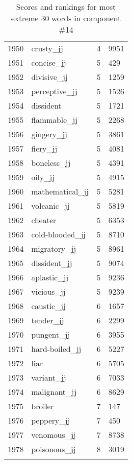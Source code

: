 \begin{longtable}[!htbp]{| rlr@{.}l |}
    1950 & crusty\_jj & 4 & 9951 \\
    1951 & concise\_jj & 5 & 429 \\
    1952 & divisive\_jj & 5 & 1259 \\
    1953 & perceptive\_jj & 5 & 1526 \\
    1954 & dissident & 5 & 1721 \\
    1955 & flammable\_jj & 5 & 2268 \\
    1956 & gingery\_jj & 5 & 3861 \\
    1957 & fiery\_jj & 5 & 4081 \\
    1958 & boneless\_jj & 5 & 4391 \\
    1959 & oily\_jj & 5 & 4915 \\
    1960 & mathematical\_jj & 5 & 5281 \\
    1961 & volcanic\_jj & 5 & 5819 \\
    1962 & cheater & 5 & 6353 \\
    1963 & cold-blooded\_jj & 5 & 8710 \\
    1964 & migratory\_jj & 5 & 8961 \\
    1965 & dissident\_jj & 5 & 9074 \\
    1966 & aplastic\_jj & 5 & 9236 \\
    1967 & vicious\_jj & 5 & 9239 \\
    1968 & caustic\_jj & 6 & 1657 \\
    1969 & tender\_jj & 6 & 2299 \\
    1970 & pungent\_jj & 6 & 3955 \\
    1971 & hard-boiled\_jj & 6 & 5227 \\
    1972 & liar & 6 & 5705 \\
    1973 & variant\_jj & 6 & 7033 \\
    1974 & malignant\_jj & 6 & 8629 \\
    1975 & broiler & 7 & 147 \\
    1976 & peppery\_jj & 7 & 450 \\
    1977 & venomous\_jj & 7 & 8738 \\
    1978 & poisonous\_jj & 8 & 3019 \\
    \hline
    \caption{Scores and rankings for most extreme 30 words in component \#14} \\
\end{longtable}
